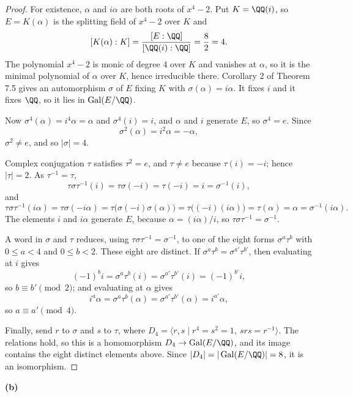 \documentclass[11pt]{article}
\begin{document}
\begin{proof}
For existence, $\alpha$ and $i\alpha$ are both roots of $x^{4}-2$. Put $K=\QQ(i)$, so $E=K(\alpha)$ is the splitting field of $x^{4}-2$ over $K$ and
\[
[K(\alpha):K]=\frac{[E:\QQ]}{[\QQ(i):\QQ]}=\frac{8}{2}=4.
\]
The polynomial $x^{4}-2$ is monic of degree $4$ over $K$ and vanishes at $\alpha$, so it is the minimal polynomial of $\alpha$ over $K$, hence irreducible there. Corollary 2 of Theorem 7.5 gives an automorphism $\sigma$ of $E$ fixing $K$ with $\sigma(\alpha)=i\alpha$. It fixes $i$ and it fixes $\QQ$, so it lies in $\operatorname{Gal}(E/\QQ)$.

Now $\sigma^{4}(\alpha)=i^{4}\alpha=\alpha$ and $\sigma^{4}(i)=i$, and $\alpha$ and $i$ generate $E$, so $\sigma^{4}=e$. Since
\[
\sigma^{2}(\alpha)=i^{2}\alpha=-\alpha,
\]
$\sigma^{2}\ne e$, and so $|\sigma|=4$.

Complex conjugation $\tau$ satisfies $\tau^{2}=e$, and $\tau\ne e$ because $\tau(i)=-i$; hence $|\tau|=2$. As $\tau^{-1}=\tau$,
\[
\tau\sigma\tau^{-1}(i)=\tau\sigma(-i)=\tau(-i)=i=\sigma^{-1}(i),
\]
and
\[
\tau\sigma\tau^{-1}(i\alpha)=\tau\sigma(-i\alpha)=\tau\bigl(\sigma(-i)\sigma(\alpha)\bigr)=\tau\bigl((-i)(i\alpha)\bigr)=\tau(\alpha)=\alpha=\sigma^{-1}(i\alpha).
\]
The elements $i$ and $i\alpha$ generate $E$, because $\alpha=(i\alpha)/i$, so $\tau\sigma\tau^{-1}=\sigma^{-1}$.

A word in $\sigma$ and $\tau$ reduces, using $\tau\sigma\tau^{-1}=\sigma^{-1}$, to one of the eight forms $\sigma^{a}\tau^{b}$ with $0\le a<4$ and $0\le b<2$. These eight are distinct. If $\sigma^{a}\tau^{b}=\sigma^{a'}\tau^{b'}$, then evaluating at $i$ gives
\[
(-1)^{b}i=\sigma^{a}\tau^{b}(i)=\sigma^{a'}\tau^{b'}(i)=(-1)^{b'}i,
\]
so $b\equiv b'\pmod 2$; and evaluating at $\alpha$ gives
\[
i^{a}\alpha=\sigma^{a}\tau^{b}(\alpha)=\sigma^{a'}\tau^{b'}(\alpha)=i^{a'}\alpha,
\]
so $a\equiv a'\pmod 4$.

Finally, send $r$ to $\sigma$ and $s$ to $\tau$, where $D_{4}=\langle r,s\mid r^{4}=s^{2}=1,\ srs=r^{-1}\rangle$. The relations hold, so this is a homomorphism $D_{4}\to\operatorname{Gal}(E/\QQ)$, and its image contains the eight distinct elements above. Since $|D_{4}|=|\operatorname{Gal}(E/\QQ)|=8$, it is an isomorphism.
\end{proof}
\noindent\textbf{(b)}
\end{document}
